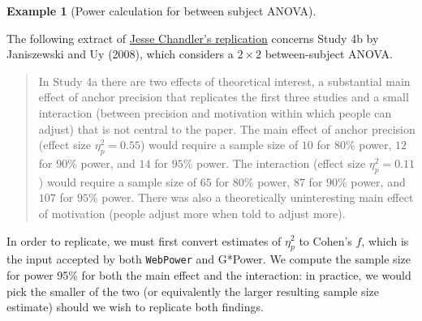 \documentclass[
  11pt,
  letterpaper,
]{scrbook}
\newenvironment{Shaded}{\begin{snugshade}}{\end{snugshade}}
\newcommand{\AttributeTok}[1]{\textcolor[rgb]{0.40,0.45,0.13}{#1}}
\newcommand{\CommentTok}[1]{\textcolor[rgb]{0.37,0.37,0.37}{#1}}
\newcommand{\DecValTok}[1]{\textcolor[rgb]{0.68,0.00,0.00}{#1}}
\newcommand{\FloatTok}[1]{\textcolor[rgb]{0.68,0.00,0.00}{#1}}
\newcommand{\FunctionTok}[1]{\textcolor[rgb]{0.28,0.35,0.67}{#1}}
\newcommand{\NormalTok}[1]{\textcolor[rgb]{0.00,0.23,0.31}{#1}}
\newcommand{\OtherTok}[1]{\textcolor[rgb]{0.00,0.23,0.31}{#1}}
\newcommand{\SpecialCharTok}[1]{\textcolor[rgb]{0.37,0.37,0.37}{#1}}
\theoremstyle{definition}
\theoremstyle{definition}
\newtheorem{example}{Example}[chapter]
\theoremstyle{remark}
\begin{document}
\begin{example}[Power calculation for between subject
ANOVA]\protect\hypertarget{exm-poweranova1}{}\label{exm-poweranova1}

The following extract of \href{https://osf.io/sd4uv/}{Jesse Chandler's
replication} concerns Study 4b by Janiszewski and Uy (2008), which
considers a \(2 \times 2\) between-subject ANOVA.

\begin{quote}
In Study 4a there are two effects of theoretical interest, a substantial
main effect of anchor precision that replicates the first three studies
and a small interaction (between precision and motivation within which
people can adjust) that is not central to the paper. The main effect of
anchor precision (effect size \(\eta^2_p=0.55\)) would require a sample
size of \(10\) for \(80\)\% power, \(12\) for \(90\)\% power, and \(14\)
for \(95\)\% power. The interaction (effect size \(\eta^2_p=0.11\))
would require a sample size of \(65\) for \(80\)\% power, \(87\) for
\(90\)\% power, and \(107\) for \(95\)\% power. There was also a
theoretically uninteresting main effect of motivation (people adjust
more when told to adjust more).
\end{quote}

In order to replicate, we must first convert estimates of \(\eta^2_p\)
to Cohen's \(f\), which is the input accepted by both \texttt{WebPower}
and G*Power. We compute the sample size for power 95\% for both the main
effect and the interaction: in practice, we would pick the smaller of
the two (or equivalently the larger resulting sample size estimate)
should we wish to replicate both findings.

\begin{Shaded}
\end{Shaded}


\end{example}
\end{document}
